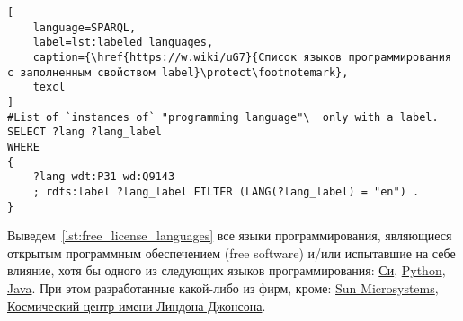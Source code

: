 \label{question:prog_lang_1}

\begin{lstlisting}[
	language=SPARQL,
	label=lst:labeled_languages,
	caption={\href{https://w.wiki/uG7}{Список языков программирования с заполненным свойством label}\protect\footnotemark},
	texcl
]
#List of `instances of` "programming language"\  only with a label.
SELECT ?lang ?lang_label
WHERE
{
    ?lang wdt:P31 wd:Q9143
    ; rdfs:label ?lang_label FILTER (LANG(?lang_label) = "en") . 
}
\end{lstlisting}

Выведем~\ref{lst:free_license_languages} все языки программирования, являющиеся открытым программным обеспечением (free software) и/или испытавшие на себе влияние, хотя бы одного из следующих языков программирования: \href{https://en.wikipedia.org/wiki/C_(programming_language)}{Си}, \href{https://ru.wikipedia.org/wiki/Python}{Python}, \href{https://ru.wikipedia.org/wiki/Java}{Java}. При этом разработанные какой-либо из фирм, кроме: \href{https://ru.wikipedia.org/wiki/Sun_Microsystems}{Sun Microsystems}, \href{https://en.wikipedia.org/wiki/Johnson_Space_Center}{Космический центр имени Линдона Джонсона}.

